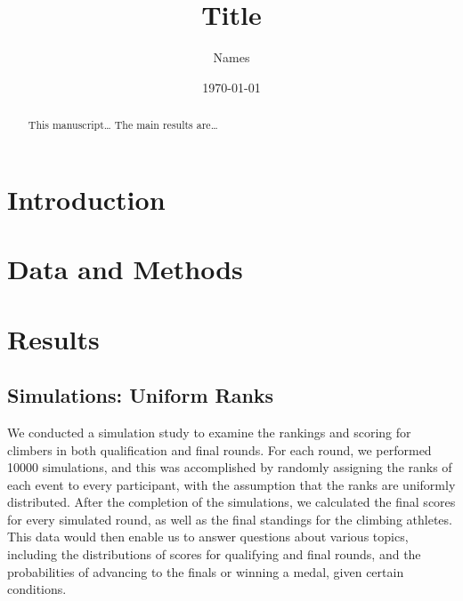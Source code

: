 \documentclass[
  12pt,
]{article}
\title{\textbf{Title}}
\author{Names}
\date{\today}
\begin{document}
\maketitle
\begin{abstract}
This manuscript\ldots{} The main results are\ldots{}
\end{abstract}

\hypertarget{introduction}{%
\section{Introduction}\label{introduction}}

\hypertarget{data-and-methods}{%
\section{Data and Methods}\label{data-and-methods}}

\hypertarget{results}{%
\section{Results}\label{results}}

\hypertarget{simulations-uniform-ranks}{%
\subsection{Simulations: Uniform
Ranks}\label{simulations-uniform-ranks}}

We conducted a simulation study to examine the rankings and scoring for
climbers in both qualification and final rounds. For each round, we
performed 10000 simulations, and this was accomplished by randomly
assigning the ranks of each event to every participant, with the
assumption that the ranks are uniformly distributed. After the
completion of the simulations, we calculated the final scores for every
simulated round, as well as the final standings for the climbing
athletes. This data would then enable us to answer questions about
various topics, including the distributions of scores for qualifying and
final rounds, and the probabilities of advancing to the finals or
winning a medal, given certain conditions.
\end{document}
